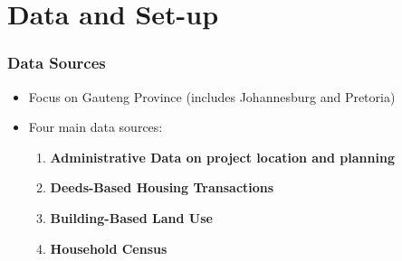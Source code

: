 \documentclass[aspectratio=32]{beamer}
\begin{document}


\section{Data and Set-up}


\begin{frame}
\frametitle{Data Sources}

\begin{itemize}
  \item Focus on Gauteng Province (includes Johannesburg and Pretoria)

  \vspace{2mm}

  \item<2-> Four main data sources:
  \vspace{2mm}
  \begin{enumerate}
    \item \textbf{Administrative Data on project location and planning} 
    \vspace{2mm}
    \item \textbf{Deeds-Based Housing Transactions} 
    \vspace{2mm}
    \item \textbf{Building-Based Land Use}
    \vspace{2mm}
    \item \textbf{Household Census}    
  \end{enumerate}

\end{itemize}

\end{frame}
\end{document}
